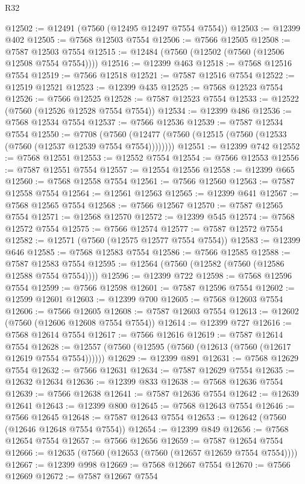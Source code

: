 \begin{lexlean}{R32}
\begin{coremodule}
@12502 := @12491 (@7560 (@12495 @12497 @7554 @7554))
@12503 := @12399 @402
@12505 := @7568 @12503 @7554
@12506 := @7566 @12505
@12508 := @7587 @12503 @7554
@12515 := @12484 (@7560 (@12502 (@7560 (@12506 @12508 @7554 @7554))))
@12516 := @12399 @463
@12518 := @7568 @12516 @7554
@12519 := @7566 @12518
@12521 := @7587 @12516 @7554
@12522 := @12519 @12521
@12523 := @12399 @435
@12525 := @7568 @12523 @7554
@12526 := @7566 @12525
@12528 := @7587 @12523 @7554
@12533 := @12522 (@7560 (@12526 @12528 @7554 @7554))
@12534 := @12399 @486
@12536 := @7568 @12534 @7554
@12537 := @7566 @12536
@12539 := @7587 @12534 @7554
@12550 := @7708
    (@7560 (@12477 (@7560 (@12515 (@7560 (@12533 (@7560 (@12537 @12539 @7554 @7554))))))))
@12551 := @12399 @742
@12552 := @7568 @12551
@12553 := @12552 @7554
@12554 := @7566 @12553
@12556 := @7587 @12551 @7554
@12557 := @12554 @12556
@12558 := @12399 @665
@12560 := @7568 @12558 @7554
@12561 := @7566 @12560
@12563 := @7587 @12558 @7554
@12564 := @12561 @12563
@12565 := @12399 @641
@12567 := @7568 @12565 @7554
@12568 := @7566 @12567
@12570 := @7587 @12565 @7554
@12571 := @12568 @12570
@12572 := @12399 @545
@12574 := @7568 @12572 @7554
@12575 := @7566 @12574
@12577 := @7587 @12572 @7554
@12582 := @12571 (@7560 (@12575 @12577 @7554 @7554))
@12583 := @12399 @646
@12585 := @7568 @12583 @7554
@12586 := @7566 @12585
@12588 := @7587 @12583 @7554
@12595 := @12564 (@7560 (@12582 (@7560 (@12586 @12588 @7554 @7554))))
@12596 := @12399 @722
@12598 := @7568 @12596 @7554
@12599 := @7566 @12598
@12601 := @7587 @12596 @7554
@12602 := @12599 @12601
@12603 := @12399 @700
@12605 := @7568 @12603 @7554
@12606 := @7566 @12605
@12608 := @7587 @12603 @7554
@12613 := @12602 (@7560 (@12606 @12608 @7554 @7554))
@12614 := @12399 @727
@12616 := @7568 @12614 @7554
@12617 := @7566 @12616
@12619 := @7587 @12614 @7554
@12628 := @12557 (@7560 (@12595 (@7560 (@12613 (@7560 (@12617 @12619 @7554 @7554))))))
@12629 := @12399 @891
@12631 := @7568 @12629 @7554
@12632 := @7566 @12631
@12634 := @7587 @12629 @7554
@12635 := @12632 @12634
@12636 := @12399 @833
@12638 := @7568 @12636 @7554
@12639 := @7566 @12638
@12641 := @7587 @12636 @7554
@12642 := @12639 @12641
@12643 := @12399 @800
@12645 := @7568 @12643 @7554
@12646 := @7566 @12645
@12648 := @7587 @12643 @7554
@12653 := @12642 (@7560 (@12646 @12648 @7554 @7554))
@12654 := @12399 @849
@12656 := @7568 @12654 @7554
@12657 := @7566 @12656
@12659 := @7587 @12654 @7554
@12666 := @12635 (@7560 (@12653 (@7560 (@12657 @12659 @7554 @7554))))
@12667 := @12399 @998
@12669 := @7568 @12667 @7554
@12670 := @7566 @12669
@12672 := @7587 @12667 @7554

\end{coremodule}
\end{lexlean}
